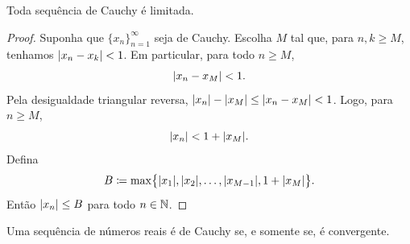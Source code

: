 \begin{prop}
Toda sequência de Cauchy é limitada.
\end{prop}

\begin{proof}
Suponha que $\{ x_n \}_{n=1}^\infty$ seja de Cauchy. Escolha $M$ tal que, para
$n,k \geq M$, tenhamos $\lvert {x_n-x_k} \rvert < 1$. Em particular,
para todo $n \geq M$,
\begin{equation*}
\lvert {x_n - x_M} \rvert < 1 .
\end{equation*}
Pela desigualdade triangular reversa,
$\lvert {x_n} \rvert - \lvert {x_M} \rvert \leq \lvert {x_n - x_M} \rvert < 1$.  Logo, para $n \geq M$,
\begin{equation*}
\lvert {x_n} \rvert < 1 + \lvert {x_M} \rvert.
\end{equation*}
Defina
\begin{equation*}
B \coloneqq \max \bigl\{ \lvert {x_1} \rvert, \lvert {x_2} \rvert, \ldots,
\lvert {x_{M-1}} \rvert, 1+ \lvert {x_M} \rvert \bigr\} .
\end{equation*}
Então $\lvert {x_n} \rvert \leq B$ para todo $n \in {\mathbb{N}}$.
\end{proof}

\begin{thm}
Uma sequência de números reais é de Cauchy se, e somente se, é convergente.
\end{thm}

